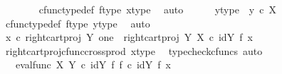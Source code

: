 \begin{isabellebody}
\ \ \ \ \ \ \isamarkupfalse%
\ cfunc{\isacharunderscore}{\kern0pt}type{\isacharunderscore}{\kern0pt}def\ f{\isacharunderscore}{\kern0pt}type\ x{\isacharunderscore}{\kern0pt}type\ \isamarkupfalse%
\ auto\isanewline
\ \ \ \ \isamarkupfalse%
\ y{\isacharunderscore}{\kern0pt}type{}\ {\isacharcolon}{\kern0pt}\ {\isachardoublequoteopen}y\ {\isasymin}\isactrlsub c\ X{\isachardoublequoteclose}\isanewline
\ \ \ \ \ \ \isamarkupfalse%
\ cfunc{\isacharunderscore}{\kern0pt}type{\isacharunderscore}{\kern0pt}def\ f{\isacharunderscore}{\kern0pt}type\ y{\isacharunderscore}{\kern0pt}type\ \isamarkupfalse%
\ auto\isanewline
\ \ \ \ \isamarkupfalse%
\ {\isachardoublequoteopen}x\ {\isasymcirc}\isactrlsub c\ {\isacharparenleft}{\kern0pt}right{\isacharunderscore}{\kern0pt}cart{\isacharunderscore}{\kern0pt}proj\ Y\ one{\isacharparenright}{\kern0pt}\ {\isacharequal}{\kern0pt}\ {\isacharparenleft}{\kern0pt}right{\isacharunderscore}{\kern0pt}cart{\isacharunderscore}{\kern0pt}proj\ Y\ X{\isacharparenright}{\kern0pt}\ {\isasymcirc}\isactrlsub c\ {\isacharparenleft}{\kern0pt}id{\isacharparenleft}{\kern0pt}Y{\isacharparenright}{\kern0pt}\ {\isasymtimes}\isactrlsub f\ x{\isacharparenright}{\kern0pt}{\isachardoublequoteclose}\isanewline
\ \ \ \ \ \ \isamarkupfalse%
\ right{\isacharunderscore}{\kern0pt}cart{\isacharunderscore}{\kern0pt}proj{\isacharunderscore}{\kern0pt}cfunc{\isacharunderscore}{\kern0pt}cross{\isacharunderscore}{\kern0pt}prod\ x{\isacharunderscore}{\kern0pt}type{}\ \isamarkupfalse%
\ {\isacharparenleft}{\kern0pt}typecheck{\isacharunderscore}{\kern0pt}cfuncs{\isacharcomma}{\kern0pt}\ auto{\isacharparenright}{\kern0pt}\isanewline
\ \ \ \ \isamarkupfalse%
\ \isamarkupfalse%
\ {\isachardoublequoteopen}{\isachardot}{\kern0pt}{\isachardot}{\kern0pt}{\isachardot}{\kern0pt}\ {\isacharequal}{\kern0pt}\ {\isacharparenleft}{\kern0pt}{\isacharparenleft}{\kern0pt}eval{\isacharunderscore}{\kern0pt}func\ X\ Y{\isacharparenright}{\kern0pt}\ {\isasymcirc}\isactrlsub c\ {\isacharparenleft}{\kern0pt}id{\isacharparenleft}{\kern0pt}Y{\isacharparenright}{\kern0pt}\ {\isasymtimes}\isactrlsub f\ f{\isacharparenright}{\kern0pt}{\isacharparenright}{\kern0pt}\ {\isasymcirc}\isactrlsub c\ {\isacharparenleft}{\kern0pt}id{\isacharparenleft}{\kern0pt}Y{\isacharparenright}{\kern0pt}\ {\isasymtimes}\isactrlsub f\ x{\isacharparenright}{\kern0pt}{\isachardoublequoteclose}\isanewline
\ \ \ \ \ \ \isamarkupfalse%

\end{isabellebody}

